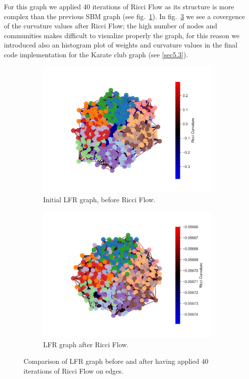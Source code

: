 For this graph we applied 40 iterations of Ricci Flow as its structure is more complex than the previous SBM graph (see fig.~\ref{fig:LFR_comparison_a}). In fig.~\ref{fig:LFR_comparison_b} we see a covergence of the curvature values after Ricci Flow; the high number of nodes and communities makes difficult to visualize properly the graph, for this reason we introduced also an histogram plot of weights and curvature values in the final code implementation for the Karate club graph (see \autoref{sec5.3}).
\begin{figure}
    \centering
    \begin{subfigure}{0.45\textwidth}
        \centering
        \includegraphics[width=\textwidth]{../tests/ToyModelResults/LFR/Before Ricci Flow.png}
        \caption{Initial LFR graph, before Ricci Flow.}
        \label{fig:LFR_comparison_a}
    \end{subfigure}
    \hfill
    \begin{subfigure}{0.45\textwidth}
        \centering
        \includegraphics[width=\textwidth]{../tests/ToyModelResults/LFR/After Ricci Flow.png}
        \caption{LFR graph after Ricci Flow.}
        \label{fig:LFR_comparison_b}
    \end{subfigure}
    \caption{Comparison of LFR graph before and after having applied 40 iterations of  Ricci Flow on edges.}
\end{figure}


